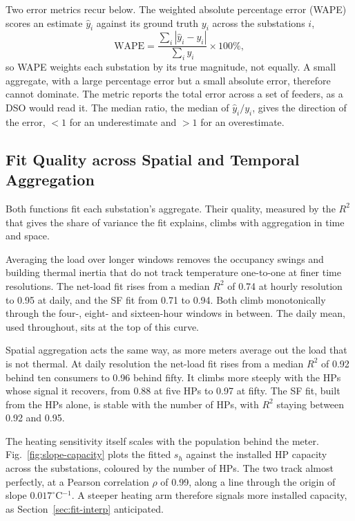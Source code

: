 \documentclass[9pt,journal,a4]{IEEEtran}
\newcommand{\chg}[1]{\textcolor{chgblue}{#1}}
\begin{document}
Two error metrics recur below. The weighted absolute percentage error (WAPE) scores an estimate $\hat{y}_i$ against its ground truth $y_i$ across the substations $i$,
\begin{equation}
	\mathrm{WAPE} = \frac{\sum_i |\hat{y}_i - y_i|}{\sum_i y_i} \times 100\%,
	\label{eq:wape}
\end{equation}
so WAPE weights each substation by its true magnitude, not equally. A small aggregate, with a large percentage error but a small absolute error, therefore cannot dominate. The metric reports the total error across a set of feeders, as a DSO would read it. The median ratio, the median of $\hat{y}_i / y_i$, gives the direction of the error, $< 1$ for an underestimate and $> 1$ for an overestimate.

\subsection{Fit Quality across Spatial and Temporal Aggregation}
\label{sec:res-ff}

Both functions fit each substation's aggregate. Their quality, measured by the $R^2$ that gives the share of variance the fit explains, climbs with aggregation in time and space.

Averaging the load over longer windows removes the occupancy swings and building thermal inertia that do not track temperature one-to-one at finer time resolutions. The net-load fit rises from a median $R^2$ of 0.74 at hourly resolution to 0.95 at daily, and the SF fit \chg{from 0.71 to 0.94}. Both climb monotonically through the four-, eight- and sixteen-hour windows in between. The daily mean, used throughout, sits at the top of this curve.

Spatial aggregation acts the same way, as more meters average out the load that is not thermal. At daily resolution the net-load fit rises from a median $R^2$ of 0.92 behind ten consumers to 0.96 behind fifty. It climbs more steeply with the HPs whose signal it recovers, from 0.88 at five HPs to 0.97 at fifty. The SF fit, built from the HPs alone, is stable with the number of HPs, with $R^2$ staying \chg{between 0.92 and 0.95}.

The heating sensitivity itself scales with the population behind the meter. Fig.~\ref{fig:slope-capacity} plots the fitted $s_h$ against the installed HP capacity across the substations, coloured by the number of HPs. The two track almost perfectly, at a Pearson correlation $\rho$ of 0.99, along a line through the origin of slope $0.017^\circ$C$^{-1}$. A steeper heating arm therefore signals more installed capacity, as Section~\ref{sec:fit-interp} anticipated.
\end{document}
